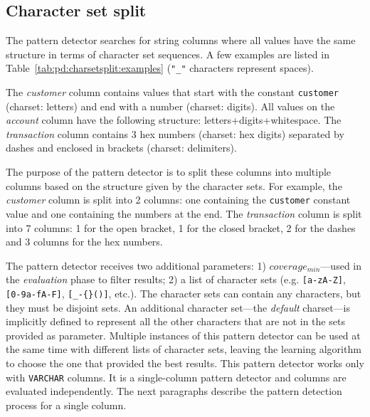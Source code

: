 \subsection{Character set split}
\label{subsec:pd:charsetsplit}



\graphicspath{{5_automatic_learning/pattern_detection/images/}}

% 

The  pattern detector searches for string columns where all values have the same structure in terms of character set sequences. A few examples are listed in Table~\ref{tab:pd:charsetsplit:examples} (\verb|"_"| characters represent spaces).



The \textit{customer} column contains values that start with the constant \verb|customer| (charset: letters) and end with a number (charset: digits). All values on the \textit{account} column have the following structure: letters+digits+whitespace. The \textit{transaction} column contains 3 hex numbers (charset: hex digits) separated by dashes and enclosed in brackets (charset: delimiters).

The purpose of the  pattern detector is to split these columns into multiple columns based on the structure given by the character sets. For example, the \textit{customer} column is split into 2 columns: one containing the \verb|customer| constant value and one containing the numbers at the end. The \textit{transaction} column is split into 7 columns: 1 for the open bracket, 1 for the closed bracket, 2 for the dashes and 3 columns for the hex numbers.

The pattern detector receives two additional parameters: 1) \(coverage_{min}\)---used in the \textit{evaluation} phase to filter results; 2) a list of character sets (e.g. \verb|[a-zA-Z]|, \verb|[0-9a-fA-F]|, \verb|[_-{}()]|, etc.). The character sets can contain any characters, but they must be disjoint sets. An additional character set---the \textit{default} charset---is implicitly defined to represent all the other characters that are not in the sets provided as parameter. Multiple instances of this pattern detector can be used at the same time with different lists of character sets, leaving the learning algorithm to choose the one that provided the best results. This pattern detector works only with \verb|VARCHAR| columns. It is a single-column pattern detector and columns are evaluated independently. The next paragraphs describe the pattern detection process for a single column.

